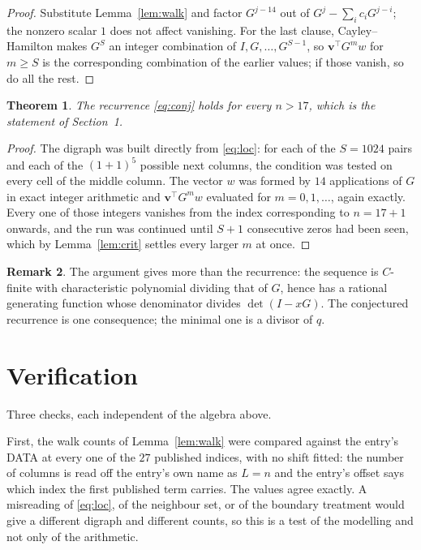 \documentclass[11pt,a4paper]{article}
\theoremstyle{plain}
\newtheorem{theorem}{Theorem}
\theoremstyle{definition}
\newtheorem{remark}[theorem]{Remark}
\begin{document}
\begin{proof}
Substitute Lemma~\ref{lem:walk} and factor $G^{j-14}$ out of
$G^{j}-\sum_ic_iG^{j-i}$; the nonzero scalar $1$ does not affect
vanishing. For the last clause, Cayley--Hamilton makes $G^{S}$ an integer combination of
$I,G,\dots,G^{S-1}$, so $\mathbf{v}^{\!\top}G^{m}w$ for $m\ge S$ is the corresponding
combination of the earlier values; if those vanish, so do all the rest.
\end{proof}

\begin{theorem}
The recurrence \eqref{eq:conj} holds for every $n>17$, which is the statement of
Section~1.
\end{theorem}

\begin{proof}
The digraph was built directly from \eqref{eq:loc}: for each of the $S=1024$ pairs and each
of the $(1+1)^{5}$ possible next columns, the condition was tested on every cell of
the middle column. The vector $w$ was formed by $14$ applications of $G$ in exact integer
arithmetic and $\mathbf{v}^{\!\top}G^{m}w$ evaluated for $m=0,1,\dots$, again exactly.
Every one of those integers vanishes from the index corresponding to $n=17+1$ onwards,
and the run was continued until $S+1$ consecutive zeros had been seen, which by
Lemma~\ref{lem:crit} settles every larger $m$ at once.
\end{proof}

\begin{remark}
The argument gives more than the recurrence: the sequence is $C$-finite with characteristic
polynomial dividing that of $G$, hence has a rational generating function whose denominator
divides $\det(I-xG)$. The conjectured recurrence is one consequence; the minimal one is a
divisor of $q$.
\end{remark}

\section{Verification}

Three checks, each independent of the algebra above.

First, the walk counts of Lemma~\ref{lem:walk} were compared against the entry's DATA at
every one of the $27$ published indices, with no shift fitted: the number of columns is
read off the entry's own name as $L=n$ and the entry's offset says which index the first
published term carries. The values agree exactly. A misreading of \eqref{eq:loc}, of the
neighbour set, or of the boundary treatment would give a different digraph and different
counts, so this is a test of the modelling and not only of the arithmetic.
\end{document}
